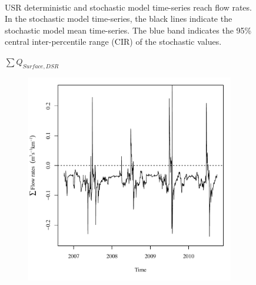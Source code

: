 \begin{linenumbers}
\begin{landscape}
\begin{figure}
\begin{subfigure}{0.7\textwidth}
		\end{subfigure}\\
		\caption[USR deterministic and stochastic model time-series reach flow rates.]{USR deterministic and stochastic model time-series reach flow rates.  In the stochastic model time-series, the black lines indicate the stochastic model mean time-series.  The blue band indicates the 95\% central inter-percentile range (CIR) of the stochastic values.}
		\label{fig:reachFlow_US}
	\end{figure}
\end{landscape}
\subfiguretop
\begin{landscape}
	\begin{figure}
		\centering
		$ \displaystyle \sum Q_{Surface,DSR} $
		\begin{subfigure}{0.7\textwidth}
			\centering
			\includegraphics[width=\tableCustomSize]{"Figures/Results_DSR/Deterministic/Balance Water - flow"}
		\end{subfigure}%
		\begin{subfigure}{0.7\textwidth}
			\centering

\end{subfigure}
\end{figure}
\end{landscape}
\end{linenumbers}
